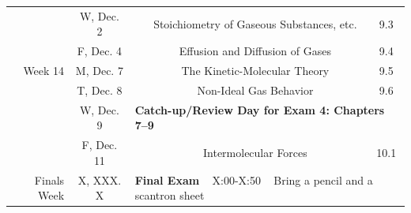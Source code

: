 \begin{tabular}{rcccc}
& W, Dec. 2&& Stoichiometry of Gaseous Substances, etc. & 9.3\\
& F, Dec. 4&& Effusion and Diffusion of Gases & 9.4\\
\midrule
Week 14 & M, Dec. 7&& The Kinetic-Molecular Theory & 9.5\\
& T, Dec. 8&& Non-Ideal Gas Behavior & 9.6\\
& W, Dec. 9& \multicolumn{3}{l}{\textbf{Catch-up/Review Day for Exam 4: Chapters 7--9}}\\
& F, Dec. 11&& Intermolecular Forces & 10.1\\
\midrule
\midrule
Finals Week & X, XXX. X & \multicolumn{3}{l}{\textbf{Final Exam} ~ X:00-X:50 ~ Bring a pencil and a scantron sheet}\\
\end{tabular}